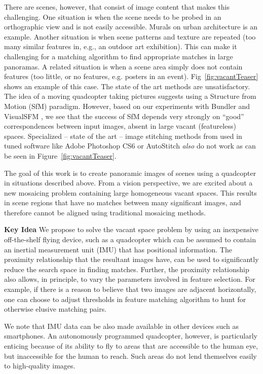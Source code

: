 There are scenes, however, that consist of image content that makes
this challenging.  One situation is when the scene needs to be probed
in an orthographic view and is not easily accessible.  Murals on
urban architecture is an example. Another situation is when scene
patterns and texture are repeated (too many similar features in, e.g.,
an outdoor art exhibition).  This can make it challenging for a
matching algorithm to find appropriate matches in large panoramas.  A
related situation is when a scene area simply does not contain
features (too little, or no features, e.g. posters in an event).
Fig~\ref{fig:vacantTeaser} shows an example of this case.  The state of the
art methods are unsatisfactory.  The idea of a moving quadcopter
taking pictures suggests using a Structure from Motion (SfM) paradigm.
However, based on our experiments with Bundler\cite{Snavely06,
  Snavely07} and VisualSFM \cite{Wu13}, we see that the success of SfM
depends very strongly on ``good'' correspondences between input
images, absent in large vacant (featureless) spaces. Specialized -- state of the art -- image stitching 
methods from \cite{Brown03, Brown05} used in tuned software like Adobe 
Photoshop CS6 or AutoStitch \emph{also} do not work as can be seen 
in Figure~\ref{fig:vacantTeaser}.


The goal of this work is to create panoramic images of scenes using a
quadcopter in situations described above. From a vision perspective,
we are excited about a new mosaicing problem containing large
homogeneous vacant spaces.  This results in scene regions that have no
matches between many significant images, and therefore cannot be
aligned using traditional mosaicing methods.


{\bf Key Idea} We propose to solve the vacant space problem by using
an inexpensive off-the-shelf flying device, such as a quadcopter which
can be assumed to contain an inertial measurement unit (IMU) that has
positional information.  The proximity relationship that the resultant
images have, can be used to significantly reduce the search space in
finding matches.  Further, the proximity relationship also allows, in
principle, to vary the parameters involved in feature selection. For
example, if there is a reason to believe that two images are adjacent
horizontally, one can choose to adjust thresholds in feature matching
algorithm to hunt for otherwise elusive matching pairs.

We note that IMU data can be also made available in other devices such
as smartphones.  An autonomously programmed quadcopter, however, is
particularly enticing because of its ability to fly to areas that are
accessible to the human eye, but inaccessible for the human to
reach. Such areas do not lend themselves easily to high-quality
images. 

